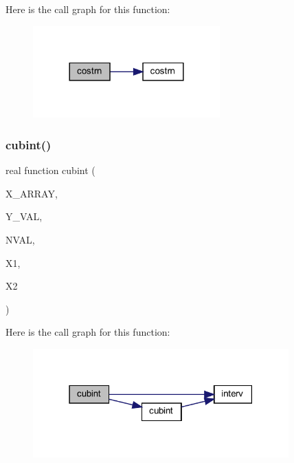 Here is the call graph for this function\+:\nopagebreak
\begin{figure}[H]
\begin{center}
\leavevmode
\includegraphics[width=204pt]{Leroi__c_8f90_a12a40dde1170214455093566ef5e8bb4_cgraph}
\end{center}
\end{figure}
\mbox{\label{Leroi__c_8f90_aee021b0986763ff84e2a9373cd2c5b9f}} 
\subsubsection{\texorpdfstring{cubint()}{cubint()}}
{\footnotesize\ttfamily real function cubint (\begin{DoxyParamCaption}\item[{real, dimension(nval)}]{X\+\_\+\+A\+R\+R\+AY,  }\item[{real, dimension(4,nval)}]{Y\+\_\+\+V\+AL,  }\item[{integer}]{N\+V\+AL,  }\item[{real}]{X1,  }\item[{real}]{X2 }\end{DoxyParamCaption})}

Here is the call graph for this function\+:\nopagebreak
\begin{figure}[H]
\begin{center}
\leavevmode
\includegraphics[width=279pt]{Leroi__c_8f90_aee021b0986763ff84e2a9373cd2c5b9f_cgraph}
\end{center}
\end{figure}
\mbox{\label{Leroi__c_8f90_a836d1cb8acb3544a3a9fa63433efc1b6}} 
